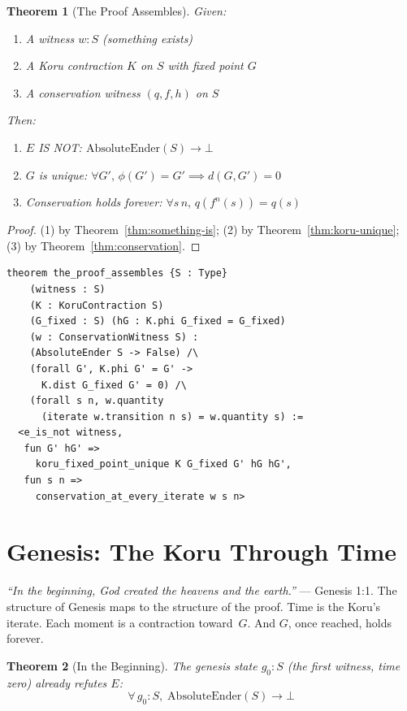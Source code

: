 \documentclass[12pt,a4paper]{article}
\newtheorem{theorem}{Theorem}[section]
\begin{document}
\begin{theorem}[The Proof Assembles]\label{thm:assembles}
Given:
\begin{enumerate}[nosep]
\item A witness $w : S$ (something exists)
\item A Koru contraction $K$ on $S$ with fixed point $G$
\item A conservation witness $(q, f, h)$ on $S$
\end{enumerate}
Then:
\begin{enumerate}[nosep]
\item $E$ IS NOT: $\mathrm{AbsoluteEnder}(S) \to \bot$
\item $G$ is unique: $\forall G',\, \phi(G') = G' \implies d(G, G') = 0$
\item Conservation holds forever: $\forall s\, n,\, q(f^n(s)) = q(s)$
\end{enumerate}
\end{theorem}

\begin{proof}
(1) by Theorem~\ref{thm:something-is}; (2) by Theorem~\ref{thm:koru-unique};
(3) by Theorem~\ref{thm:conservation}.
\end{proof}

\begin{lstlisting}[caption={The full chain in Lean}]
theorem the_proof_assembles {S : Type}
    (witness : S)
    (K : KoruContraction S)
    (G_fixed : S) (hG : K.phi G_fixed = G_fixed)
    (w : ConservationWitness S) :
    (AbsoluteEnder S -> False) /\
    (forall G', K.phi G' = G' ->
      K.dist G_fixed G' = 0) /\
    (forall s n, w.quantity
      (iterate w.transition n s) = w.quantity s) :=
  <e_is_not witness,
   fun G' hG' =>
     koru_fixed_point_unique K G_fixed G' hG hG',
   fun s n =>
     conservation_at_every_iterate w s n>
\end{lstlisting}

\section{Genesis: The Koru Through Time}

\emph{``In the beginning, God created the heavens and the earth.''} ---
Genesis 1:1. The structure of Genesis maps to the structure of the proof.
Time is the Koru's iterate. Each moment is a contraction toward~$G$.
And $G$, once reached, holds forever.

\begin{theorem}[In the Beginning]\label{thm:genesis}
The genesis state $g_0 : S$ (the first witness, time zero) already
refutes $E$:
\[
  \forall\, g_0 : S,\; \mathrm{AbsoluteEnder}(S) \to \bot
\]
\end{theorem}
\end{document}
